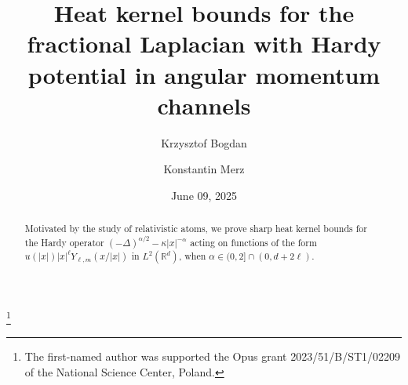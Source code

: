 \documentclass[12pt,reqno]{amsart}
\newcommand\version{June 09, 2025}
\theoremstyle{definition}
\theoremstyle{remark}
\numberwithin{equation}{section}
\newcommand{\1}{\mathbbm{1}}
\newcommand{\R}{\mathbb{R}}
\begin{document}
\title[Heat kernel bounds --- \version]{Heat kernel bounds for the fractional Laplacian with Hardy potential in angular momentum channels}


\author[K. Bogdan]{Krzysztof Bogdan}
\address[Krzysztof Bogdan]{Department of Pure and Applied Mathematics, Wroc\l aw University of Science and Technology, Hoene-Wro\'nskiego 13C, 50-376 Wroc\l aw, Poland}
\thanks{The first-named author was  supported the Opus grant 2023/51/B/ST1/02209 of the National Science Center, Poland.}

\author[K. Merz]{Konstantin Merz}
\address[Konstantin Merz]{Institut f\"ur Analysis und Algebra, Technische Universit\"at Braunschweig, Universit\"atsplatz 2, 38106 Braun\-schweig, Germany, and Institut f\"ur Partielle Differentialgleichungen, Technische Universit\"at Braunschweig, Uni\-ver\-si\-t\"ats\-platz 2, 38106 Braun\-schweig, Germany}

 


\date{\version}

\begin{abstract}
  Motivated by the study of relativistic atoms, we prove sharp heat kernel bounds for the Hardy operator $(-\Delta)^{\alpha/2}-\kappa|x|^{-\alpha}$ acting on functions of the form $u(|x|) |x|^{\ell} Y_{\ell,m}(x/|x|)$ in $L^2(\R^d)$, when $\alpha\in(0,2]\cap(0,d+2\ell)$.
\end{abstract}


\maketitle
\vspace*{-2em}
\tableofcontents
\end{document}
